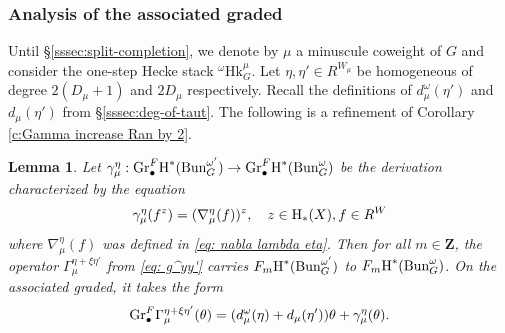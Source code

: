 \documentclass[reqno]{amsart}
\numberwithin{equation}{subsection}
\newtheorem{lemma}[subsubsection]{Lemma}
\theoremstyle{definition}
\newcommand{\Bun}{\textup{Bun}}
\newcommand{\Gr}{\textup{Gr}}
\newcommand\Hk{\mathrm{Hk}}
\newcommand{\bu}{\bullet}
\newcommand{\homog}[2]{\textup{H}_{#1}({#2})}  %
\newcommand{\cohog}[2]{\textup{H}^{#1}({#2})}     %
\newcommand\g\gamma
\newcommand\G\Gamma
\renewcommand{\th}{\theta}
\newcommand{\y}{\eta}
\newcommand{\om}{\omega}
\newcommand\nb{\nabla}
\newcommand{\Z}{\mathbf{Z}}
\begin{document}
\subsubsection{Analysis of the associated graded}
Until \S\ref{sssec:split-completion}, we denote by $\mu$ a minuscule coweight of $G$ and consider the one-step Hecke stack ${}^\om\Hk^\mu_G$.  Let $\y, \y'\in R^{W_{\mu}}$ be homogeneous of degree $2(D_\mu+1)$ and $2D_\mu$ respectively. Recall the definitions of $d_\mu^\omega(\eta ')$ and $d_\mu(\eta')$ from \S \ref{sssec:deg-of-taut}. The following is a refinement of Corollary \ref{c:Gamma increase Ran by 2}.

\begin{lemma}\label{lem: split case associated graded endomorphism}
Let $\g^{\y}_{\mu}: \Gr^F_{\bu}\cohog{*}{\Bun^{\om'}_{G}}\to \Gr^F_{\bu}\cohog{*}{\Bun^{\om}_{G}}$ be the derivation characterized by the equation
\begin{equation*}
\g^{\y}_{\mu}(f^{z})=(\nb^{\y}_{\mu}(f))^{z}, \quad z\in \homog{*}{X}, f\in R^{W}
\end{equation*}
where $\nb^{\y}_{\mu}(f)$ was defined in \eqref{eq: nabla lambda eta}. Then for all $m \in \Z$, the operator $\G_{\mu}^{\y + \xi \y'}$ from \eqref{eq: g^yy'} carries $F_{m}\cohog{*}{\Bun^{\om'}_{G}}$ to $F_{m}\cohog{*}{\Bun^{\om}_{G}}$. On the associated graded, it takes the form
\begin{equation*}
\Gr^F_{\bu}\G_{\mu}^{\y + \xi \y'}(\th)=(d^{\om}_{\mu}(\y)+d_{\mu}(\y'))\th+\g^{\y}_{\mu}(\th).
\end{equation*}

\end{lemma}
\end{document}
